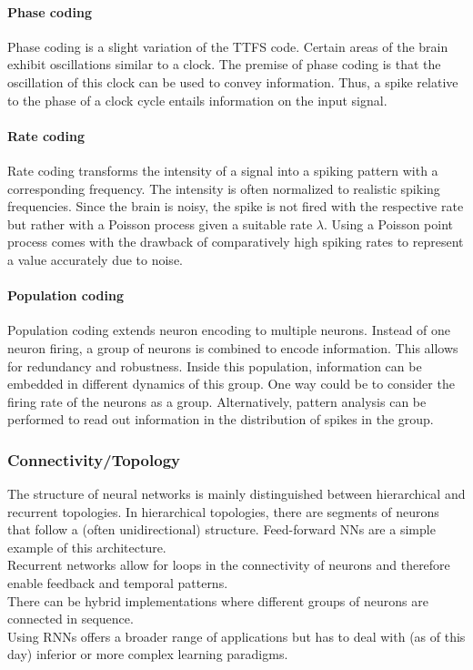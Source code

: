 	\paragraph{Phase coding}
	Phase coding is a slight variation of the \ac{TTFS} code. Certain areas of the brain exhibit oscillations similar to a clock\cite{jacobs_critical_2013}. The premise of phase coding is that the oscillation of this clock can be used to convey information. Thus, a spike relative to the phase of a clock cycle entails information on the input signal.\\
	\paragraph{Rate coding}
	Rate coding transforms the intensity of a signal into a spiking pattern with a corresponding frequency. The intensity is often normalized to realistic spiking frequencies. Since the brain is noisy, the spike is not fired with the respective rate but rather with a Poisson process given a suitable rate $\lambda$.
	Using a Poisson point process comes with the drawback of comparatively high spiking rates to represent a value accurately due to noise\cite{deneve_efficient_2016}.
	\paragraph{Population coding}
	Population coding extends neuron encoding to multiple neurons. Instead of one neuron firing, a group of neurons is combined to encode information. This allows for redundancy and robustness. Inside this population, information can be embedded in different dynamics of this group. One way could be to consider the firing rate of the neurons as a group. Alternatively, pattern analysis can be performed to read out information in the distribution of spikes in the group.\\

\subsubsection{Connectivity/Topology}
	The structure of neural networks is mainly distinguished between hierarchical and recurrent topologies. In hierarchical topologies, there are segments of neurons that follow a (often unidirectional) structure. Feed-forward \acp{NN} are a simple example of this architecture.\\
	Recurrent networks allow for loops in the connectivity of neurons and therefore enable feedback and temporal patterns.\\
	There can be hybrid implementations where different groups of neurons are connected in sequence.\\
	Using \acp{RNN} offers a broader range of applications but has to deal with (as of this day) inferior or more complex learning paradigms.\\

